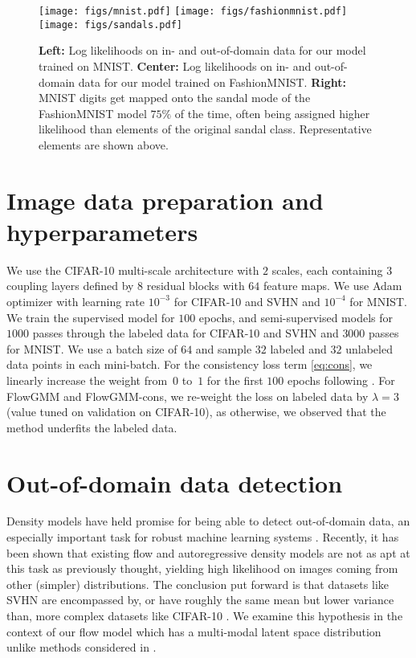 \documentclass{article}
\newcommand{\method}{FlowGMM\xspace}
\newcommand{\methodcons}{FlowGMM-cons\xspace}
\begin{document}
\begin{figure*}[t]
	\texttt{[image: figs/mnist.pdf]}
	\texttt{[image: figs/fashionmnist.pdf]}
	\texttt{[image: figs/sandals.pdf]}
	\caption{
	\textbf{Left:} Log likelihoods on in- and out-of-domain data for our model trained on MNIST.
    \textbf{Center:} Log likelihoods on in- and out-of-domain data for our model trained on FashionMNIST.
    \textbf{Right:} MNIST digits get mapped onto the sandal mode of the FashionMNIST model $75\%$ of the time, often being assigned higher likelihood than elements of the original sandal class. Representative elements are shown above.
	}
	\label{fig:mnist_notmnist}
    \vspace{-.3cm}
\end{figure*}

\section{Image data preparation and hyperparameters}\label{sec:imageexptsdetails}
We use the CIFAR-10
multi-scale architecture with $2$ scales, each containing $3$ coupling layers
defined by $8$ residual blocks with $64$ feature maps. We use Adam optimizer
\citep{kingma2014adam} with learning rate $10^{-3}$ for CIFAR-10 and SVHN
and $10^{-4}$ for MNIST. We train the supervised model for $100$ epochs,
and semi-supervised models for $1000$ passes through the labeled data for CIFAR-10 and SVHN and $3000$ passes for MNIST. We use a batch
size of $64$ and sample $32$ labeled and $32$ unlabeled data points in each 
mini-batch.
For the consistency
loss term \eqref{eq:cons}, we linearly increase the weight from~$0$ to~$1$
for the first $100$ epochs following \citet{athiwaratkun2018there}. For \method and \methodcons, we re-weight the loss on labeled data 
by $\lambda = 3$ (value tuned on validation \citep{kingma2014semi} on CIFAR-10), as otherwise, we observed that the method underfits the labeled data. 

\section{Out-of-domain data detection}

Density models have held promise for being able to detect out-of-domain data, an especially important task for robust machine learning systems \citep{nalisnick2019hybrid}. Recently, it has been shown that existing flow and autoregressive density models are not as apt at this task as previously thought, yielding high likelihood on images coming from other (simpler) distributions. The conclusion put forward is that datasets like SVHN are encompassed by, or have roughly the same mean but lower variance than, more complex datasets like CIFAR-10 \citep{nalisnick2018deep}.
We examine this hypothesis in the context of our flow model which has a multi-modal latent space distribution unlike methods considered in \citet{nalisnick2018deep}.
\label{sec:ood}
\end{document}

